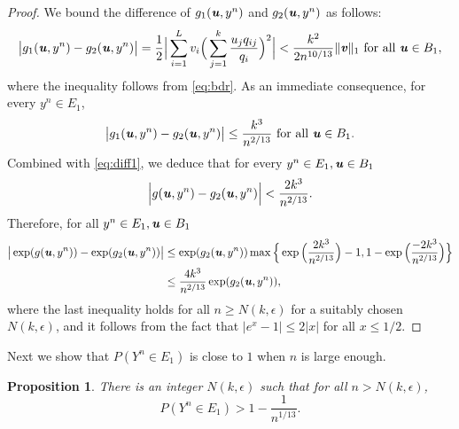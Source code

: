 \documentclass[11pt,onecolumn]{IEEEtran}
\newtheorem{proposition}[theorem]{Proposition}
\def\mathbi#1{{\textbf{\textit #1}}}
\begin{document}
\begin{proof}
We bound the difference of $g_1(\mathbi{u},y^n)$ and $g_2(\mathbi{u},y^n)$ as follows:
\begin{equation}\label{eq:allu}
\big| g_1(\mathbi{u},y^n) - g_2(\mathbi{u},y^n) \big|
 = \frac{1}{2} \Big| \sum_{i=1}^L   v_i  \Big(\sum_{j=1}^k \frac{u_j q_{ij}}{q_i} \Big)^2 \Big| 
< \frac{k^2}{2 n^{10/13}} \|\mathbi{v}\|_1 \text{~for all~}  \mathbi{u}\in B_1,
\end{equation}
where the inequality follows from \eqref{eq:bdr}.
As an immediate consequence, for every $y^n\in E_1$,
$$
\big| g_1(\mathbi{u},y^n) - g_2(\mathbi{u},y^n) \big|
\le \frac{k^3}{n^{2/13}}  \text{~for all~}  \mathbi{u}\in B_1.
$$
Combined with \eqref{eq:diff1}, we deduce that for every $y^n \in E_1,\mathbi{u}\in B_1$
$$
\Big| g(\mathbi{u},y^n) - g_2(\mathbi{u},y^n) \Big|
< \frac{2k^3}{n^{2/13}}.
$$
Therefore, for all $y^n \in E_1,\mathbi{u}\in B_1$
\begin{equation}
\begin{aligned}
\big| \exp(g(\mathbi{u},y^n)) - \exp(g_2(\mathbi{u},y^n)) \big|
& \le  \exp(g_2(\mathbi{u},y^n)) \max\Big\{\exp\Big(\frac{2k^3}{n^{2/13}} \Big)-1,1-\exp \Big(\frac{-2k^3}{n^{2/13}} \Big) \Big\} \\
& \le  \frac{4k^3}{n^{2/13}}   \exp(g_2(\mathbi{u},y^n)),
\end{aligned}
\end{equation}
where the last inequality holds for all $n\ge N(k,\epsilon)$ for a suitably chosen $N(k,\epsilon)$, and it follows from the fact that $|e^x-1|\le 2|x|$ for all $x\le 1/2$. 
\end{proof}

Next we show that $P(Y^n \in E_1)$ is close to $1$ when $n$ is large enough.
\begin{proposition}
There is an integer $N(k,\epsilon)$ such that for all $n>N(k,\epsilon)$,
\begin{equation}\label{eq:diffp}
P(Y^n \in E_1) 
> 1 - \frac{1}{n^{1/13}}.
\end{equation}
\end{proposition}
\end{document}
